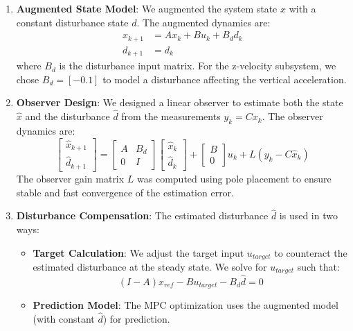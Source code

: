 \documentclass{article}
\begin{document}
\begin{enumerate}
    \item \textbf{Augmented State Model}:
    We augmented the system state $x$ with a constant disturbance state $d$. The augmented dynamics are:
    \begin{align*}
    x_{k+1} &= A x_k + B u_k + B_d d_k \\
    d_{k+1} &= d_k
    \end{align*}
    where $B_d$ is the disturbance input matrix. For the z-velocity subsystem, we chose $B_d = [-0.1]$ to model a disturbance affecting the vertical acceleration.

    \item \textbf{Observer Design}:
    We designed a linear observer to estimate both the state $\hat{x}$ and the disturbance $\hat{d}$ from the measurements $y_k = C x_k$. The observer dynamics are:
    \[
    \begin{bmatrix} \hat{x}_{k+1} \\ \hat{d}_{k+1} \end{bmatrix} = 
    \begin{bmatrix} A & B_d \\ 0 & I \end{bmatrix} \begin{bmatrix} \hat{x}_k \\ \hat{d}_k \end{bmatrix} + 
    \begin{bmatrix} B \\ 0 \end{bmatrix} u_k + 
    L (y_k - C \hat{x}_k)
    \]
    The observer gain matrix $L$ was computed using pole placement to ensure stable and fast convergence of the estimation error.

    \item \textbf{Disturbance Compensation}:
    The estimated disturbance $\hat{d}$ is used in two ways:
    \begin{itemize}
        \item \textbf{Target Calculation}: We adjust the target input $u_{target}$ to counteract the estimated disturbance at the steady state. We solve for $u_{target}$ such that:
        \[ (I - A) x_{ref} - B u_{target} - B_d \hat{d} = 0 \]
        \item \textbf{Prediction Model}: The MPC optimization uses the augmented model (with constant $\hat{d}$) for prediction.
    \end{itemize}
\end{enumerate}
\end{document}
